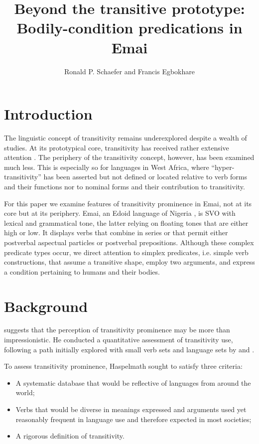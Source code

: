 \documentclass[output=paper,colorlinks,citecolor=brown
]{langscibook}
\author{Ronald P. Schaefer\orcid{}\affiliation{Southern Illinois University Edwardsville} and        Francis Egbokhare\orcid{}\affiliation{University of Ibadan}}
\title{Beyond the transitive prototype: Bodily-condition predications in Emai}
\begin{document}
\maketitle

\section{Introduction}

The linguistic concept of transitivity remains underexplored despite a wealth of studies. At its prototypical core, transitivity has received rather extensive attention \citep{HopperandThompson1980, Tsunoda1985, Rice1987, Kittila2002, Kittila2008, Naess2007, Haspelmath2015}. The periphery of the transitivity concept, however, has been examined much less. This is especially so for languages in West Africa, where “hyper-transitivity” has been asserted \citep{AmekaEssegbey2006, Ameka2013, MuyskinSmith2015} but not defined or located relative to verb forms and their functions nor to nominal forms and their contribution to transitivity.  

For this paper we examine features of transitivity prominence in Emai, not at its core but at its periphery. Emai, an Edoid language of Nigeria \citet{Elugbe1989}, is SVO with lexical and grammatical tone, the latter relying on floating tones that are either high or low. It displays verbs that combine in series or that permit either postverbal aspectual particles or postverbal prepositions. Although these complex predicate types occur, we direct attention to simplex predicates, i.e. simple verb constructions, that assume a transitive shape, employ two arguments, and express a condition pertaining to humans and their bodies.

\section{Background}
\citet{Haspelmath2015} suggests that the perception of transitivity prominence may be more than impressionistic. He conducted a quantitative assessment of transitivity use, following a path initially explored with small verb sets and language sets by \citet{MullerGotama1994} and \citet{Bossong1998}. 

To assess transitivity prominence, Haspelmath sought to satisfy three criteria: 

\begin{itemize}
        \item A systematic database that would be reflective of languages from around the world;
        \item Verbs that would be diverse in meanings expressed and arguments used yet reasonably frequent in language use and therefore expected in most societies; 
        \item A rigorous definition of transitivity. 
\end{itemize}
\end{document}
